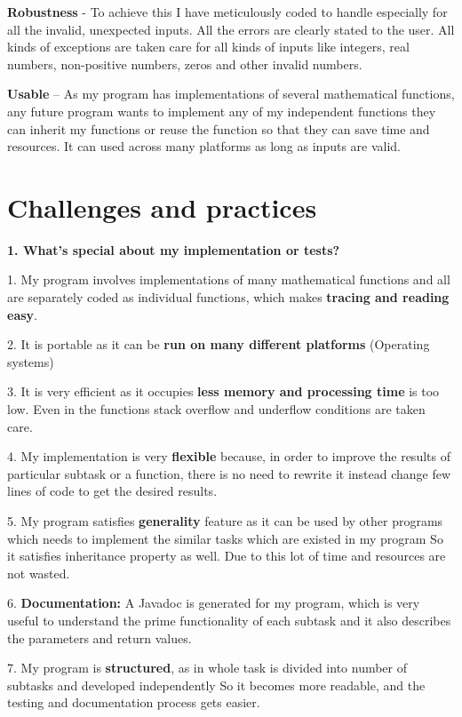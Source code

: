 \documentclass[12pt]{report}
\begin{document}
\textbf{Robustness}  -  To achieve this I have meticulously coded to handle especially for all the invalid, unexpected inputs. All the errors are clearly stated to the user. All kinds of exceptions are taken care for all kinds of inputs like integers, real numbers, non-positive numbers, zeros and other invalid numbers.

\textbf{Usable}  – As my program has implementations of several mathematical functions, any future program wants to implement any of my independent functions they can inherit my functions or reuse the function so that they can save time and resources. It can used across many platforms as long as inputs are valid.

\newpage
\section{Challenges and practices}

\textbf{1. What's special about my implementation or tests? }

1.	My program involves implementations of many mathematical functions and all are separately coded as individual functions, which makes 
\textbf{tracing and reading easy}.

2.	It is portable as it can be \textbf{run on many different platforms} (Operating systems)

3.	It is very efficient as it occupies \textbf{less memory and processing time} is too low. Even in the functions stack overflow and underflow conditions are taken care.

4.	My implementation is very \textbf{flexible} because, in order to improve the results of particular subtask or a function, there is no need to rewrite it instead change few lines of code to get the desired results.

5.	My program satisfies \textbf{generality} feature as it can be used by other programs which needs to implement the similar tasks which are existed in my program So it satisfies inheritance property as well. Due to this lot of time and resources are not wasted.

6.	\textbf{Documentation:} A Javadoc is generated for my program, which is very useful to understand the prime functionality of each subtask and it also describes the parameters and return values.

7.	My program is \textbf{structured}, as in whole task is divided into number of subtasks and developed independently So it becomes more readable, and the testing and documentation process gets easier.
\end{document}
